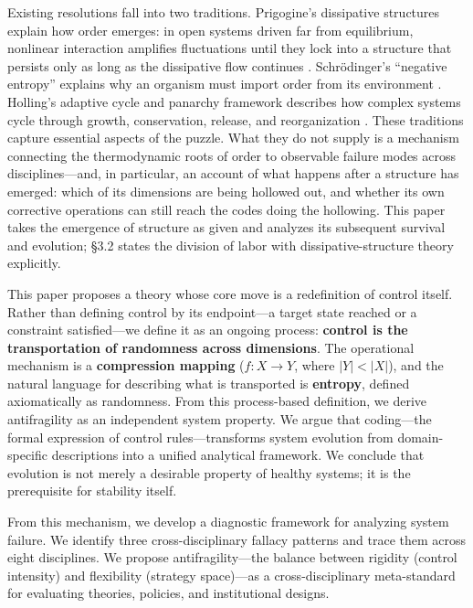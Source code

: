 \documentclass[11pt,a4paper]{article}
\begin{document}
Existing resolutions fall into two traditions. Prigogine's dissipative structures explain how order emerges: in open systems driven far from equilibrium, nonlinear interaction amplifies fluctuations until they lock into a structure that persists only as long as the dissipative flow continues \citep{nicolis1977, prigogine1984}. Schrödinger's ``negative entropy'' explains why an organism must import order from its environment \citep{schrodinger1944}. Holling's adaptive cycle and panarchy framework describes how complex systems cycle through growth, conservation, release, and reorganization \citep{holling1973, gunderson2002}. These traditions capture essential aspects of the puzzle. What they do not supply is a mechanism connecting the thermodynamic roots of order to observable failure modes across disciplines---and, in particular, an account of what happens after a structure has emerged: which of its dimensions are being hollowed out, and whether its own corrective operations can still reach the codes doing the hollowing. This paper takes the emergence of structure as given and analyzes its subsequent survival and evolution; \S3.2 states the division of labor with dissipative-structure theory explicitly.

This paper proposes a theory whose core move is a redefinition of control itself. Rather than defining control by its endpoint---a target state reached or a constraint satisfied---we define it as an ongoing process: \textbf{control is the transportation of randomness across dimensions}. The operational mechanism is a \textbf{compression mapping} ($f: X \rightarrow Y$, where $|Y| < |X|$), and the natural language for describing what is transported is \textbf{entropy}, defined axiomatically as randomness. From this process-based definition, we derive antifragility as an independent system property. We argue that coding---the formal expression of control rules---transforms system evolution from domain-specific descriptions into a unified analytical framework. We conclude that evolution is not merely a desirable property of healthy systems; it is the prerequisite for stability itself.

From this mechanism, we develop a diagnostic framework for analyzing system failure. We identify three cross-disciplinary fallacy patterns and trace them across eight disciplines. We propose antifragility---the balance between rigidity (control intensity) and flexibility (strategy space)---as a cross-disciplinary meta-standard for evaluating theories, policies, and institutional designs.
\end{document}

